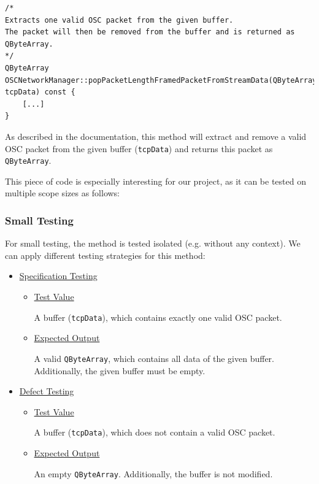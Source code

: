 \documentclass{scrreprt}
\begin{document}
\begin{lstlisting}[title=src/OSCNetworkManager.cpp]
/*
Extracts one valid OSC packet from the given buffer. 
The packet will then be removed from the buffer and is returned as QByteArray.
*/
QByteArray OSCNetworkManager::popPacketLengthFramedPacketFromStreamData(QByteArray& tcpData) const {
	[...]
}
\end{lstlisting}
\bigskip

As described in the documentation, this method will extract and remove a valid OSC packet from the given buffer (\texttt{tcpData}) and returns this packet as \texttt{QByteArray}.

This piece of code is especially interesting for our project, as it can be tested on multiple scope sizes as follows:

\subsubsection{Small Testing}

For small testing, the method is tested isolated (e.g. without any context). We can apply different testing strategies for this method:

\begin{itemize}
	\item[] \underline{Specification Testing} %
	
	\begin{itemize}
		\item[] \underline{Test Value}
		
		A buffer (\texttt{tcpData}), which contains exactly one valid OSC packet.
		
		\item[] \underline{Expected Output}
		
		A valid \texttt{QByteArray}, which contains all data of the given buffer. Additionally, the given buffer must be empty.
	\end{itemize}

	\item[] \underline{Defect Testing}
	
	\begin{itemize}
		\item[] \underline{Test Value}
		
		A buffer (\texttt{tcpData}), which does not contain a valid OSC packet.
		
		\item[] \underline{Expected Output}
		
		An empty \texttt{QByteArray}. Additionally, the buffer is not modified.
	\end{itemize}
\end{itemize}
\end{document}
